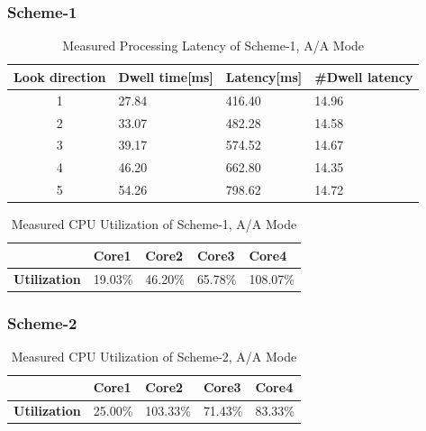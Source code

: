 \subsubsection{Scheme-1}
\begin{table}[h!]
	\centering
	\begin{tabular}{|c|l|l|l|} 
	 \hline
	 \textbf{Look direction} & \textbf{Dwell time[ms]} & \textbf{Latency[ms]} & \textbf{\#Dwell latency} \\
	 \hline
	 1 & 27.84 & 416.40 & 14.96 \\ \hline
	 2 & 33.07 & 482.28 & 14.58 \\ \hline
	 3 & 39.17 & 574.52 & 14.67 \\ \hline
	 4 & 46.20 & 662.80 & 14.35 \\ \hline
	 5 & 54.26 & 798.62 & 14.72 \\ \hline
	\end{tabular}
	\caption{Measured Processing Latency of Scheme-1, A/A Mode}
	\label{tbl:mm:scheme1_true_latency}
\end{table}

\begin{table}[h!]
	\centering
	\begin{tabular}{|l|l|l|l|l|} 
	 \hline
	& \textbf{Core1} & \textbf{Core2} & \textbf{Core3} & \textbf{Core4} \\ \hline
	\textbf{Utilization} & 19.03\% & 46.20\% & 65.78\% & {\color{red} 108.07\%} \\ \hline
	\end{tabular}
	\caption{Measured CPU Utilization of Scheme-1, A/A Mode}
	\label{tbl:mm:scheme1_true_util}
\end{table}

\subsubsection{Scheme-2}
\begin{table}[h!]
	\centering
	\begin{tabular}{|l|l|l|l|l|} 
	 \hline
	& \textbf{Core1} & \textbf{Core2} & \textbf{Core3} & \textbf{Core4} \\ \hline
	\textbf{Utilization} & 25.00\% & {\color{red} 103.33\%} & 71.43\% & 83.33\% \\ \hline
	\end{tabular}
	\caption{Measured CPU Utilization of Scheme-2, A/A Mode}
	\label{tbl:mm:scheme2_true_util}
\end{table}

